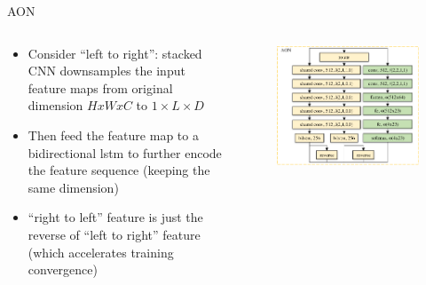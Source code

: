 \documentclass[compress]{beamer}
\begin{document}
\begin{frame}[allowframebreaks]{AON}
    \begin{columns}
        \begin{column}[T]{.5\textwidth}
            \begin{itemize}
                \item Consider ``left to right'': stacked CNN downsamples the input feature maps from original dimension $HxWxC$ to $1\times L \times D$
                \item Then feed the feature map to a bidirectional lstm to further encode the feature sequence (keeping the same dimension)
                \item ``right to left'' feature is just the reverse of ``left to right'' feature (which accelerates training convergence)
            \end{itemize}
        \end{column}
        \begin{column}[T]{.5\textwidth}
            \begin{figure}
                \includegraphics[width=\textwidth,height=.8\textheight]{aon}
            \end{figure}
        \end{column}
    \end{columns}
    \framebreak
    \begin{columns}
        \begin{column}[T]{.5\textwidth}
            \begin{itemize}

\end{itemize}
\end{column}
\end{columns}
\end{frame}
\end{document}
